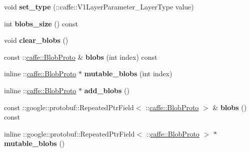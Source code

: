 \begin{DoxyCompactItemize}
\item 
\mbox{\label{classcaffe_1_1_v1_layer_parameter_a4f1dfb7a4f8b0bcef552df6ae09fce48}} 
void {\bfseries set\+\_\+type} (\+::caffe\+::\+V1\+Layer\+Parameter\+\_\+\+Layer\+Type value)
\item 
\mbox{\label{classcaffe_1_1_v1_layer_parameter_aaccfd4a7e924085a3c19671d39fca47a}} 
int {\bfseries blobs\+\_\+size} () const
\item 
\mbox{\label{classcaffe_1_1_v1_layer_parameter_a9e478a67ab11b0599bd9e36d03b0ac06}} 
void {\bfseries clear\+\_\+blobs} ()
\item 
\mbox{\label{classcaffe_1_1_v1_layer_parameter_a64f6344aa65b556a86e16a2eae3c21bb}} 
const \+::\mbox{\hyperlink{classcaffe_1_1_blob_proto}{caffe\+::\+Blob\+Proto}} \& {\bfseries blobs} (int index) const
\item 
\mbox{\label{classcaffe_1_1_v1_layer_parameter_a6bf91c33e63ab3228d90720577788264}} 
inline \+::\mbox{\hyperlink{classcaffe_1_1_blob_proto}{caffe\+::\+Blob\+Proto}} $\ast$ {\bfseries mutable\+\_\+blobs} (int index)
\item 
\mbox{\label{classcaffe_1_1_v1_layer_parameter_a6849a08eaf112094689ab7d12be9a200}} 
inline \+::\mbox{\hyperlink{classcaffe_1_1_blob_proto}{caffe\+::\+Blob\+Proto}} $\ast$ {\bfseries add\+\_\+blobs} ()
\item 
\mbox{\label{classcaffe_1_1_v1_layer_parameter_a319ac2eff8532883dc159b6c76563524}} 
const \+::google\+::protobuf\+::\+Repeated\+Ptr\+Field$<$ \+::\mbox{\hyperlink{classcaffe_1_1_blob_proto}{caffe\+::\+Blob\+Proto}} $>$ \& {\bfseries blobs} () const
\item 
\mbox{\label{classcaffe_1_1_v1_layer_parameter_abbf63fba6d06982ce29ddec1ce9548f6}} 
inline \+::google\+::protobuf\+::\+Repeated\+Ptr\+Field$<$ \+::\mbox{\hyperlink{classcaffe_1_1_blob_proto}{caffe\+::\+Blob\+Proto}} $>$ $\ast$ {\bfseries mutable\+\_\+blobs} ()
\item 

\end{DoxyCompactItemize}
